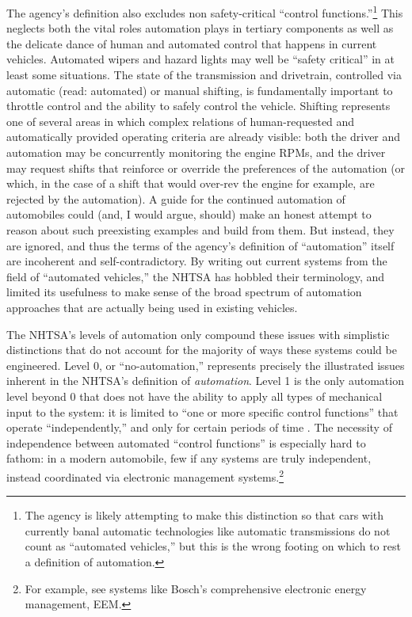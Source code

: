 The agency's definition also excludes non safety-critical ``control
functions.''\footnote{The agency is likely attempting to make this distinction
so that cars with currently banal automatic technologies like
automatic transmissions do 
not count as ``automated vehicles,'' but this is the wrong footing on
which to rest a definition of automation.} This neglects both the
vital roles automation plays in tertiary components as well as
the delicate dance of human and automated control that happens in
current vehicles. Automated wipers and hazard
lights may well be ``safety critical'' in at least some situations.
The state of the transmission 
and drivetrain, controlled via automatic (read: automated) or manual
shifting, is fundamentally important to throttle control and the
ability to safely control the vehicle. Shifting represents one of
several areas
in which complex relations of human-requested and
automatically provided operating criteria are already visible: both
the driver and automation may be concurrently monitoring the engine
RPMs, and the driver may request shifts that reinforce or override the
preferences of the automation (or which, in the case of a shift that would
over-rev the engine for example, are rejected by the automation). A guide for the
continued automation of automobiles could (and, I would argue, should)
make an honest attempt to reason about such preexisting examples and
build from them. But instead, they are ignored, and thus the
terms of the agency's definition of ``automation'' itself are incoherent
and self-contradictory. By writing out current systems from the field
of ``automated vehicles,'' the NHTSA has hobbled their terminology,
and limited its usefulness to make sense of the broad spectrum of automation
approaches that are actually being used in existing vehicles.


The NHTSA's levels of automation only compound these
issues with simplistic distinctions that do not account for the
majority of ways these systems could be engineered. Level 0, or
``no-automation,'' represents 
precisely the illustrated issues inherent in the NHTSA's definition of
\emph{automation}. Level 
1 is the only automation level beyond 0 that does not have the
ability to apply all types of mechanical input to the system: it is
limited to ``one or more specific control functions'' that operate
``independently,'' and only for certain periods of time \cite[p. 4]{NHTSA}. The
necessity of independence between automated ``control functions'' is
especially hard to fathom: in a modern automobile, few if any systems
are truly independent, instead coordinated via electronic management
systems.\footnote{For example, see systems like Bosch's comprehensive
  electronic energy management, EEM.} 

